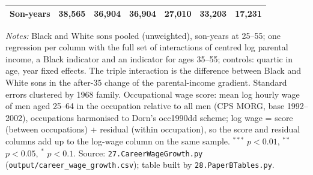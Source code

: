 \begin{table}[!htbp]
{{\begin{tabular}{lcccccc}
Son-years & 38,565 & 36,904 & 36,904 & 27,010 & 33,203 & 17,231 \\
\bottomrule
\end{tabular}}}
\par\smallskip
\begin{minipage}{\textwidth}\footnotesize \textit{Notes:} Black and White sons pooled (unweighted), son-years at 25--55; one regression per column with the full set of interactions of centred log parental income, a Black indicator and an indicator for ages 35--55; controls: quartic in age, year fixed effects. The triple interaction is the difference between Black and White sons in the after-35 change of the parental-income gradient. Standard errors clustered by 1968 family. Occupational wage score: mean log hourly wage of men aged 25--64 in the occupation relative to all men (CPS MORG, base 1992--2002), occupations harmonised to Dorn's occ1990dd scheme; log wage = score (between occupations) + residual (within occupation), so the score and residual columns add up to the log-wage column on the same sample. $^{***}$ $p<0.01$, $^{**}$ $p<0.05$, $^{*}$ $p<0.1$. Source: \texttt{27.CareerWageGrowth.py} (\texttt{output/career\_wage\_growth.csv}); table built by \texttt{28.PaperBTables.py}.\end{minipage}
\end{table}
